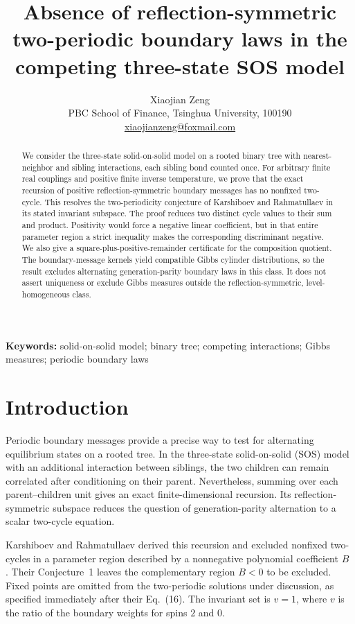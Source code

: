 \documentclass[11pt,a4paper]{article}
\title{Absence of reflection-symmetric two-periodic boundary laws in the competing three-state SOS model}
\author{Xiaojian Zeng\\[3pt]
\small PBC School of Finance, Tsinghua University, 100190\\
\small \href{mailto:xiaojianzeng@foxmail.com}{xiaojianzeng@foxmail.com}}
\date{}
\numberwithin{equation}{section}
\begin{document}
\maketitle
\begin{abstract}
We consider the three-state solid-on-solid model on a rooted binary tree with
nearest-neighbor and sibling interactions, each sibling bond counted once.
For arbitrary finite real couplings and positive finite inverse temperature,
we prove that the exact recursion of positive reflection-symmetric boundary
messages has no nonfixed two-cycle. This resolves the two-periodicity
conjecture of Karshiboev and Rahmatullaev in its stated invariant subspace.
The proof reduces two distinct cycle values to their sum and product.
Positivity would force a negative linear coefficient, but in that entire
parameter region a strict inequality makes the corresponding discriminant
negative. We also give a square-plus-positive-remainder certificate for the
composition quotient. The boundary-message kernels yield compatible Gibbs
cylinder distributions, so the result excludes alternating generation-parity
boundary laws in this class. It does not assert uniqueness or exclude Gibbs
measures outside the reflection-symmetric, level-homogeneous class.
\end{abstract}

\noindent\textbf{Keywords:} solid-on-solid model; binary tree; competing interactions;
Gibbs measures; periodic boundary laws

\section{Introduction}
Periodic boundary messages provide a precise way to test for alternating
equilibrium states on a rooted tree. In the three-state solid-on-solid (SOS)
model with an additional interaction between siblings, the two children
can remain correlated after conditioning on their parent. Nevertheless,
summing over each parent--children unit gives an exact finite-dimensional
recursion. Its reflection-symmetric subspace reduces the question of
generation-parity alternation to a scalar two-cycle equation.

Karshiboev and Rahmatullaev derived this recursion and excluded nonfixed
two-cycles in a parameter region described by a nonnegative polynomial
coefficient $B$ \cite[Sec.~5, Theorem~3]{KR2025}. Their Conjecture~1 leaves
the complementary region $B<0$ to be excluded. Fixed points are omitted
from the two-periodic solutions under discussion, as specified immediately
after their Eq.~(16). The invariant set is $v=1$, where $v$ is the ratio
of the boundary weights for spins $2$ and $0$.
\end{document}
